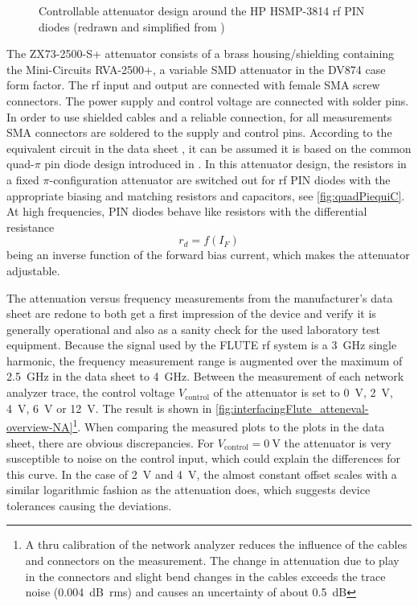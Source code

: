 \begin{figure}[tb]
    \centering
	
	\caption[Design of a controllable attenuator]{Controllable attenuator design around the HP HSMP-3814 \gls{rf} PIN diodes (redrawn and simplified from \cite{waughLowCostSurfaceMount1992})}
    \label{fig:quadPiequiC}
\end{figure}




The ZX73-2500-S+ attenuator consists of a brass housing/shielding containing the Mini-Circuits RVA-2500+, a variable SMD attenuator in the DV874 case form factor. The \gls{rf} input and output are connected with female SMA screw connectors. The power supply and control voltage are connected with solder pins. In order to use shielded cables and a reliable connection, for all measurements SMA connectors are soldered to the supply and control pins. According to the equivalent circuit in the data sheet \cite{mini-circuitsZX732500VoltageVariable}, it can be assumed it is based on the common quad-$\pi$ pin diode design introduced in \cite{waughLowCostSurfaceMount1992}. In this attenuator design, the resistors in a fixed $\pi$-configuration attenuator are switched out for \gls{rf} PIN diodes with the appropriate biasing and matching resistors and capacitors, see \autoref{fig:quadPiequiC}. At high frequencies, PIN diodes behave like resistors with the differential resistance
\begin{equation}
r_d = f(I_F)
\end{equation}
being an inverse function of the forward bias current, which makes the attenuator adjustable.

The attenuation versus frequency measurements from the manufacturer's data sheet are redone to both get a first impression of the device and verify it is generally operational and also as a sanity check for the used laboratory test equipment.
Because the signal used by the FLUTE \gls{rf} system is a \SI{3}{\GHz} single harmonic, the frequency measurement range is augmented over the maximum of \SI{2.5}{\GHz} in the data sheet to \SI{4}{\GHz}.
Between the measurement of each network analyzer trace, the control voltage $V_\text{control}$ of the attenuator is set to \SI{0}{\volt}, \SI{2}{\volt}, \SI{4}{\volt}, \SI{6}{\volt} or \SI{12}{\volt}.
The result is shown in \autoref{fig:interfacingFlute_atteneval-overview-NA}\footnote{A thru calibration of the network analyzer reduces the influence of the cables and connectors on the measurement. The change in attenuation due to play in the connectors and slight bend changes in the cables exceeds the trace noise (\SI{0.004}{\dB rms}) and causes an uncertainty of about \SI{0.5}{\dB}}.
When comparing the measured plots to the plots in the data sheet, there are obvious discrepancies. For $V_\text{control}=\SI{0}{\volt}$ the attenuator is very susceptible to noise on the control input, which could explain the differences for this curve. In the case of \SI{2}{\volt} and \SI{4}{\volt}, the almost constant offset scales with a similar logarithmic fashion as the attenuation does, which suggests device tolerances causing the deviations.

